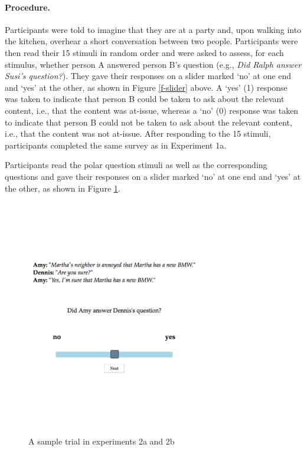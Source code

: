\documentclass[11pt,fleqn]{article}
\newcommand{\6}{\mbox{$[\hspace*{-.6mm}[$}}
\newcommand{\9}{\mbox{$]\hspace*{-.6mm}]$}}
\begin{document}
\paragraph{Procedure.} Participants were told to imagine that they are at a party and, upon walking into the kitchen, overhear a short conversation between two people. Participants were then read their 15 stimuli in random order and were asked to assess, for each stimulus, whether person A answered person B's question (e.g., {\em Did Ralph answer Susi's question?}). They gave their responses on a slider marked `no' at one end and `yes' at the other, as shown in Figure \ref{f-slider} above. A `yes' (1) response was taken to indicate that person B could be taken to ask about the relevant content, i.e., that the content was at-issue, whereas a `no' (0) response was taken to indicate that person B could not be taken to ask about the relevant content, i.e., that the content was not at-issue. After responding to the 15 stimuli, participants completed the same survey as in Experiment 1a.

Participants read the polar question stimuli as well as the corresponding questions and gave their responses on a slider marked `no' at one end and `yes' at the other, as shown in Figure \ref{f-trial-exp2}.  


\begin{figure}[!h]
\begin{center}
\includegraphics[width=8cm]{figures/exp2-trial}
\end{center}
\caption{A sample trial in experiments 2a and 2b}\label{f-trial-exp2}
\end{figure}
\end{document}
